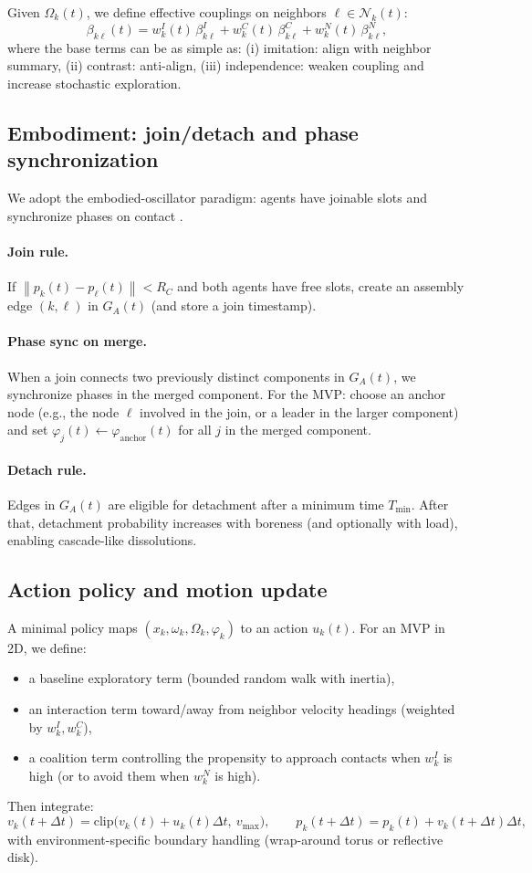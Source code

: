 \documentclass[11pt]{article}
\newcommand{\Neigh}{\mathcal{N}} %
\newcommand{\norm}[1]{\left\lVert #1 \right\rVert}
\newcommand{\varph}{\varphi}
\begin{document}
Given $\Omega_k(t)$, we define effective couplings on neighbors $\ell\in \Neigh_k(t)$:
\[
\beta_{k\ell}(t) = w^I_k(t)\,\beta^I_{k\ell} + w^C_k(t)\,\beta^C_{k\ell} + w^N_k(t)\,\beta^N_{k\ell},
\]
where the base terms can be as simple as:
(i) imitation: align with neighbor summary,
(ii) contrast: anti-align,
(iii) independence: weaken coupling and increase stochastic exploration.

\subsection{Embodiment: join/detach and phase synchronization}
We adopt the embodied-oscillator paradigm: agents have joinable slots and synchronize phases on contact
\cite{lucas_acsos2024_embodied}.

\paragraph{Join rule.}
If $\norm{p_k(t)-p_\ell(t)}<R_C$ and both agents have free slots, create an assembly edge $(k,\ell)$ in $G_A(t)$
(and store a join timestamp).

\paragraph{Phase sync on merge.}
When a join connects two previously distinct components in $G_A(t)$, we synchronize phases in the merged component.
For the MVP: choose an anchor node (e.g., the node $\ell$ involved in the join, or a leader in the larger component)
and set $\varph_j(t)\leftarrow\varph_{\text{anchor}}(t)$ for all $j$ in the merged component.

\paragraph{Detach rule.}
Edges in $G_A(t)$ are eligible for detachment after a minimum time $T_{\min}$.
After that, detachment probability increases with boreness (and optionally with load), enabling cascade-like dissolutions.

\subsection{Action policy and motion update}
A minimal policy maps $(x_k,\omega_k,\Omega_k,\varph_k)$ to an action $u_k(t)$.
For an MVP in 2D, we define:
\begin{itemize}[leftmargin=2.2em]
\item a baseline exploratory term (bounded random walk with inertia),
\item an interaction term toward/away from neighbor velocity headings (weighted by $w^I_k,w^C_k$),
\item a coalition term controlling the propensity to approach contacts when $w^I_k$ is high (or to avoid them when $w^N_k$ is high).
\end{itemize}
Then integrate:
\[
v_k(t+\Delta t)=\mathrm{clip}\bigl(v_k(t)+u_k(t)\Delta t,\ v_{\max}\bigr),\qquad
p_k(t+\Delta t)=p_k(t)+v_k(t+\Delta t)\Delta t,
\]
with environment-specific boundary handling (wrap-around torus or reflective disk).
\end{document}
